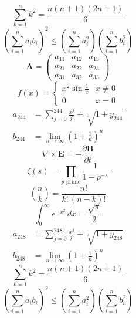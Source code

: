 \documentclass[11pt]{article}
\begin{document}
\begin{equation}
\sum_{k=1}^{n} k^2 = \frac{n(n+1)(2n+1)}{6}
\end{equation}
\begin{equation}
\left( \sum_{i=1}^n a_i b_i \right)^2 \le \left(\sum_{i=1}^n a_i^2\right)\left(\sum_{i=1}^n b_i^2\right)
\end{equation}
\begin{equation}
\mathbf{A} = \begin{pmatrix} a_{11} & a_{12} & a_{13} \\ a_{21} & a_{22} & a_{23} \\ a_{31} & a_{32} & a_{33} \end{pmatrix}
\end{equation}
\begin{equation}
f(x) = \begin{cases} x^2 \sin\frac{1}{x} & x \ne 0 \\ 0 & x = 0 \end{cases}
\end{equation}
\begin{align}
  a_{244} &= \sum_{j=0}^{244} \frac{x^j}{j!} + \sqrt[3]{1+y_{244}} \\
  b_{244} &= \lim_{n\to\infty} \left(1+\frac{1}{n}\right)^{n}
\end{align}
\begin{equation}
\nabla \times \mathbf{E} = -\frac{\partial \mathbf{B}}{\partial t}
\end{equation}
\begin{equation}
\zeta(s) = \prod_{p \text{ prime}} \frac{1}{1 - p^{-s}}
\end{equation}
\begin{equation}
\binom{n}{k} = \frac{n!}{k!\,(n-k)!}
\end{equation}
\begin{equation}
\int_0^\infty e^{-x^2}\,dx = \frac{\sqrt{\pi}}{2}
\end{equation}
\begin{align}
  a_{248} &= \sum_{j=0}^{248} \frac{x^j}{j!} + \sqrt[3]{1+y_{248}} \\
  b_{248} &= \lim_{n\to\infty} \left(1+\frac{1}{n}\right)^{n}
\end{align}
\begin{equation}
\sum_{k=1}^{n} k^2 = \frac{n(n+1)(2n+1)}{6}
\end{equation}
\begin{equation}
\left( \sum_{i=1}^n a_i b_i \right)^2 \le \left(\sum_{i=1}^n a_i^2\right)\left(\sum_{i=1}^n b_i^2\right)
\end{equation}
\end{document}
